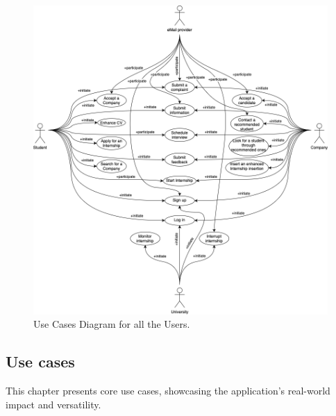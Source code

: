 \begin{figure}[H]
    \begin{center}
        \includegraphics[width=\linewidth]{Images/UCDiagram.png}
        \caption{Use Cases Diagram for all the Users.} 
        \label{fig:UnregisteredUC}%
        \end{center}
\end{figure}


\subsection{Use cases}
\label{subsec: use_cases}%
\setcounter{uc}{1}
\newcommand{\cuc}{\theuc\stepcounter{uc}}

This chapter presents core use cases, showcasing the application's real-world impact and versatility.

